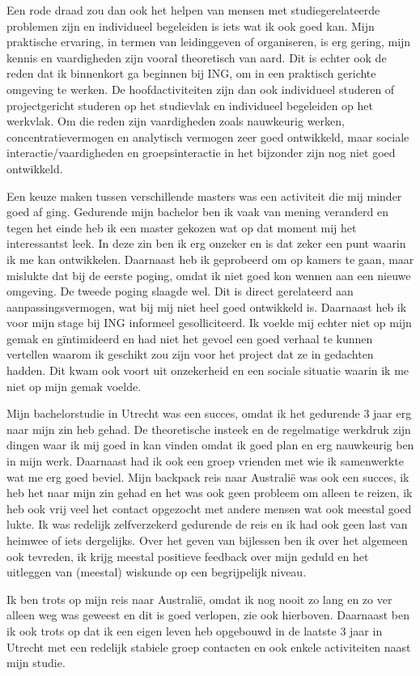 \documentclass[11pt,a4paper,onecolumn]{article}
\begin{document}
Een rode draad zou dan ook het helpen van mensen met studiegerelateerde problemen zijn en individueel begeleiden is iets wat ik ook goed kan. Mijn praktische ervaring, in termen van leidinggeven of organiseren, is erg gering, mijn kennis en vaardigheden zijn vooral theoretisch van aard. Dit is echter ook de reden dat ik binnenkort ga beginnen bij ING, om in een praktisch gerichte omgeving te werken. De hoofdactiviteiten zijn dan ook individueel studeren of projectgericht studeren op het studievlak en individueel begeleiden op het werkvlak. Om die reden zijn vaardigheden zoals nauwkeurig werken, concentratievermogen en analytisch vermogen zeer goed ontwikkeld, maar sociale interactie/vaardigheden en groepsinteractie in het bijzonder zijn nog niet goed ontwikkeld.

Een keuze maken tussen verschillende masters was een activiteit die mij minder goed af ging. Gedurende mijn bachelor ben ik vaak van mening veranderd en tegen het einde heb ik een master gekozen wat op dat moment mij het interessantst leek. In deze zin ben ik erg onzeker en is dat zeker een punt waarin ik me kan ontwikkelen. Daarnaast heb ik geprobeerd om op kamers te gaan, maar mislukte dat bij de eerste poging, omdat ik niet goed kon wennen aan een nieuwe omgeving. De tweede poging slaagde wel. Dit is direct gerelateerd aan aanpassingsvermogen, wat bij mij niet heel goed ontwikkeld is. Daarnaast heb ik voor mijn stage bij ING informeel gesolliciteerd. Ik voelde mij echter niet op mijn gemak en g\"intimideerd en had niet het gevoel een goed verhaal te kunnen vertellen waarom ik geschikt zou zijn voor het project dat ze in gedachten hadden. Dit kwam ook voort uit onzekerheid en een sociale situatie waarin ik me niet op mijn gemak voelde.

Mijn bachelorstudie in Utrecht was een succes, omdat ik het gedurende 3 jaar erg naar mijn zin heb gehad. De theoretische insteek en de regelmatige werkdruk zijn dingen waar ik mij goed in kan vinden omdat ik goed plan en erg nauwkeurig ben in mijn werk. Daarnaast had ik ook een groep vrienden met wie ik samenwerkte wat me erg goed beviel. Mijn backpack reis naar Australi\"e was ook een succes, ik heb het naar mijn zin gehad en het was ook geen probleem om alleen te reizen, ik heb ook vrij veel het contact opgezocht met andere mensen wat ook meestal goed lukte. Ik was redelijk zelfverzekerd gedurende de reis en ik had ook geen last van heimwee of iets dergelijks. Over het geven van bijlessen ben ik over het algemeen ook tevreden, ik krijg meestal positieve feedback over mijn geduld en het uitleggen van (meestal) wiskunde op een begrijpelijk niveau.

Ik ben trots op mijn reis naar Australi\"e, omdat ik nog nooit zo lang en zo ver alleen weg was geweest en dit is goed verlopen, zie ook hierboven. Daarnaast ben ik ook trots op dat ik een eigen leven heb opgebouwd in de laatste 3 jaar in Utrecht met een redelijk stabiele groep contacten en ook enkele activiteiten naast mijn studie.
\end{document}
